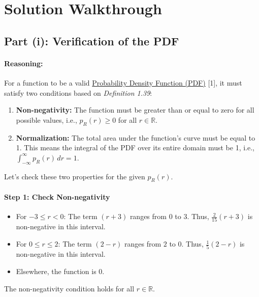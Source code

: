 \documentclass[11pt,a4paper]{article}
\newcommand{\concept}[2]{\hyperlink{note:#1}{#2}}
\begin{document}
\section{Solution Walkthrough}

\subsection{Part (i): Verification of the PDF}
\paragraph{Reasoning:}
For a function to be a valid \concept{pdf}{Probability Density Function (PDF)} [1], it must satisfy two conditions based on \textit{Definition 1.39}:
\begin{enumerate}
    \item \textbf{Non-negativity:} The function must be greater than or equal to zero for all possible values, i.e., $p_R(r) \ge 0$ for all $r \in \mathbb{R}$.
    \item \textbf{Normalization:} The total area under the function's curve must be equal to 1. This means the integral of the PDF over its entire domain must be 1, i.e., $\int_{-\infty}^{\infty} p_R(r) \,dr = 1$.
\end{enumerate}
Let's check these two properties for the given $p_R(r)$.

\paragraph{Step 1: Check Non-negativity}
\begin{itemize}
    \item For $-3 \le r < 0$: The term $(r+3)$ ranges from $0$ to $3$. Thus, $\frac{2}{15}(r+3)$ is non-negative in this interval.
    \item For $0 \le r \le 2$: The term $(2-r)$ ranges from $2$ to $0$. Thus, $\frac{1}{5}(2-r)$ is non-negative in this interval.
    \item Elsewhere, the function is $0$.
\end{itemize}
The non-negativity condition holds for all $r \in \mathbb{R}$.
\end{document}
